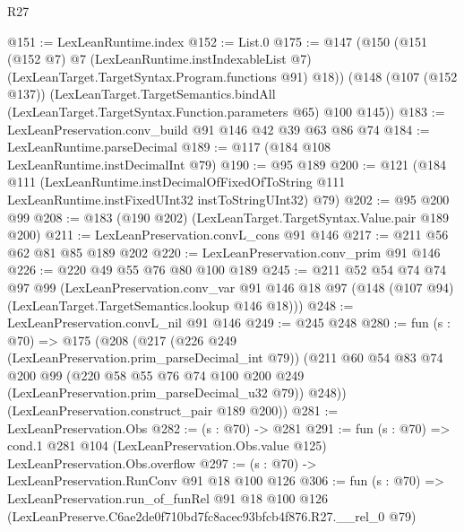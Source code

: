 \begin{lexlean}{R27}
\begin{coremodule}
@151 := LexLeanRuntime.index
@152 := List.{0}
@175 := @147
    (@150
      (@151
        (@152 @7)
        @7
        (LexLeanRuntime.instIndexableList @7)
        (LexLeanTarget.TargetSyntax.Program.functions @91)
        @18))
    (@148
      (@107 (@152 @137))
      (LexLeanTarget.TargetSemantics.bindAll
        (LexLeanTarget.TargetSyntax.Function.parameters @65)
        @100
        @145))
@183 := LexLeanPreservation.conv_build @91 @146 @42 @39 @63 @86 @74
@184 := LexLeanRuntime.parseDecimal
@189 := @117 (@184 @108 LexLeanRuntime.instDecimalInt @79)
@190 := @95 @189
@200 := @121
    (@184
      @111
      (LexLeanRuntime.instDecimalOfFixedOfToString
        @111
        LexLeanRuntime.instFixedUInt32
        instToStringUInt32)
      @79)
@202 := @95 @200 @99
@208 := @183 (@190 @202) (LexLeanTarget.TargetSyntax.Value.pair @189 @200)
@211 := LexLeanPreservation.convL_cons @91 @146
@217 := @211 @56 @62 @81 @85 @189 @202
@220 := LexLeanPreservation.conv_prim @91 @146
@226 := @220 @49 @55 @76 @80 @100 @189
@245 := @211
    @52
    @54
    @74
    @74
    @97
    @99
    (LexLeanPreservation.conv_var
      @91
      @146
      @18
      @97
      (@148 (@107 @94) (LexLeanTarget.TargetSemantics.lookup @146 @18)))
@248 := LexLeanPreservation.convL_nil @91 @146
@249 := @245 @248
@280 := fun (s : @70) =>
  @175
    (@208
      (@217
        (@226 @249 (LexLeanPreservation.prim_parseDecimal_int @79))
        (@211
          @60
          @54
          @83
          @74
          @200
          @99
          (@220 @58 @55 @76 @74 @100 @200 @249 (LexLeanPreservation.prim_parseDecimal_u32 @79))
          @248))
      (LexLeanPreservation.construct_pair @189 @200))
@281 := LexLeanPreservation.Obs
@282 := (s : @70) -> @281
@291 := fun (s : @70) =>
  cond.{1} @281 @104 (LexLeanPreservation.Obs.value @125) LexLeanPreservation.Obs.overflow
@297 := (s : @70) -> LexLeanPreservation.RunConv @91 @18 @100 @126
@306 := fun (s : @70) =>
  LexLeanPreservation.run_of_funRel
    @91
    @18
    @100
    @126
    (LexLeanPreserve.C6ae2de0f710bd7fc8acec93bfcb4f876.R27.__rel_0 @79)
\end{coremodule}
\end{lexlean}
